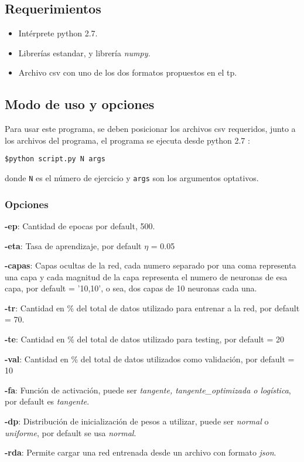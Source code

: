 \subsection{Requerimientos}
\begin{itemize}
\item Intérprete python 2.7.
\item Librerías estandar, y librería \textit{numpy.}
\item Archivo csv con uno de los dos formatos propuestos en el tp. 

\end{itemize}

\subsection{Modo de uso y opciones}
Para usar este programa, se deben posicionar los archivos csv requeridos, junto a los archivos del programa, el programa se ejecuta desde python 2.7 :

\texttt{\$python script.py N args}

donde \texttt{N} es el número de ejercicio y \texttt{args} son los argumentos optativos.


\subsubsection{Opciones}


\textbf{-ep}: Cantidad de epocas por default, 500.

\textbf{-eta}: Tasa de aprendizaje, por default $\eta$ = 0.05

\textbf{-capas}: Capas ocultas de la red, cada numero separado por una coma representa una capa y cada magnitud de la capa representa el numero de neuronas de esa capa, por default = '10,10', o sea, dos capas de 10 neuronas cada una.

\textbf{-tr}:  Cantidad en \% del total de datos utilizado para entrenar a la red, por default = 70.

\textbf{-te}: Cantidad en \% del total de datos utilizado para testing, por default = 20

\textbf{-val}: Cantidad en \% del total de datos utilizados como validación, por default = 10

\textbf{-fa}: Función de activación, puede ser \textit{tangente, tangente\_optimizada o logística}, por default es \textit{tangente}.

\textbf{-dp}: Distribución de inicialización de pesos a utilizar, puede ser \textit{normal} o \textit{uniforme}, por default se usa \textit{normal}.

\textbf{-rda}: Permite cargar una red entrenada desde un archivo con formato \textit{json}.